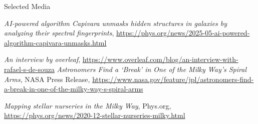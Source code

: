 \begin{rubric}{Selected Media}


\entry*[May 14, 2025]%
\emph{AI-powered algorithm Capivara unmasks hidden structures in galaxies by analyzing their spectral fingerprints}, 
\url{https://phys.org/news/2025-05-ai-powered-algorithm-capivara-unmasks.html}


\entry*[Jul 27, 2022]%
\emph{An interview by overleaf},  
\url{https://www.overleaf.com/blog/an-interview-with-rafael-s-de-souza}
%
\entry*[Aug 17, 2021]%
\emph{Astronomers Find a ‘Break’ in One of the Milky Way’s Spiral Arms}, 
NASA Press Release,  
\url{https://www.nasa.gov/feature/jpl/astronomers-find-a-break-in-one-of-the-milky-way-s-spiral-arms}

\entry*[Dec 1, 2020]%
\emph{Mapping stellar nurseries in the Milky Way},
Phys.org,  
\url{https://phys.org/news/2020-12-stellar-nurseries-milky.html}




\end{rubric}

